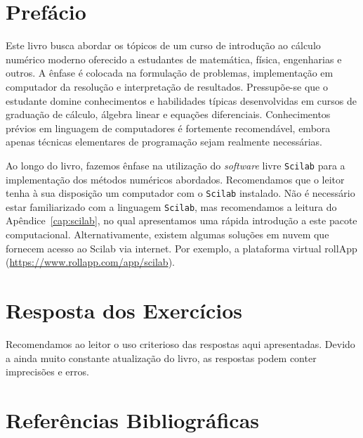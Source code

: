 \documentclass[12pt]{book}
\begin{document}
\chapter*{Prefácio}

Este livro busca abordar os tópicos de um curso de introdução ao cálculo numérico moderno oferecido a estudantes de matemática, física, engenharias e outros. A ênfase é colocada na formulação de problemas, implementação em computador da resolução e interpretação de resultados. Pressupõe-se que o estudante domine conhecimentos e habilidades típicas desenvolvidas em cursos de graduação de cálculo, álgebra linear e equações diferenciais. Conhecimentos prévios em linguagem de computadores é fortemente recomendável, embora apenas técnicas elementares de programação sejam realmente necessárias.

\ifisscilab
Ao longo do livro, fazemos ênfase na utilização do \emph{software} livre \verb+Scilab+ para a implementação dos métodos numéricos abordados. Recomendamos que o leitor tenha à sua disposição um computador com o \verb+Scilab+ instalado. Não é necessário estar familiarizado com a linguagem \verb+Scilab+, mas recomendamos a leitura do Apêndice~\ref{cap:scilab}, no qual apresentamos uma rápida introdução a este pacote computacional. Alternativamente, existem algumas soluções em nuvem que fornecem acesso ao Scilab via internet. Por exemplo, a plataforma virtual rollApp (\url{https://www.rollapp.com/app/scilab}).
\fi


\mainmatter










\ifisscilab
\appendix

\fi

\chapter*{Resposta dos Exercícios}
Recomendamos ao leitor o uso criterioso das respostas aqui apresentadas. Devido a ainda muito constante atualização do livro, as respostas podem conter imprecisões e erros.
\shipoutAnswer  

\nocite{*}

\begingroup
\chapter*{Referências Bibliográficas}
\renewcommand{\chapter}[2]{}

\endgroup

\clearpage
{}
\printindex
\end{document}
